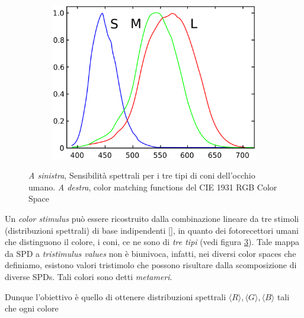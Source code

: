 \begin{figure}
	\centering
	\begin{subfigure}[t]{0.4\textwidth}
		\includegraphics[width=\textwidth]{../assets/chapter2_colorimetry_cones.png}
		\label{chapter2:CMFs:coneSpectralSensitivity}
	\end{subfigure}
	\begin{subfigure}[t]{0.55\textwidth}
		
		\label{chapter2:CMFs:RGBColorMatchingFunctions}
	\end{subfigure}
	\caption{\textit{A sinistra}, Sensibilit\`a spettrali per i tre tipi di coni dell'occhio umano. \textit{A destra}, color matching functions del 
			CIE 1931 RGB Color Space}
	\label{chapter2:CMFs}
\end{figure}
Un \textit{color stimulus} pu\`o essere ricostruito dalla combinazione lineare da tre stimoli (distribuzioni spettrali) di base indipendenti 
[\cite{color}], in quanto dei fotorecettori umani che distinguono il colore, i coni, ce ne sono di \textit{tre tipi} (vedi figura 
\ref{chapter2:CMFs}). Tale mappa da SPD a \textit{tristimulus values} non \`e biunivoca, 
infatti, nei diversi color 
spaces che definiamo, esistono valori tristimolo che possono risultare dalla scomposizione di diverse SPDs. Tali colori 
sono detti \textit{metameri}.\par 
Dunque l'obiettivo \`e quello di ottenere distribuzioni spettrali $\langle R\rangle, \langle G\rangle, \langle B\rangle$ tali che ogni colore 

